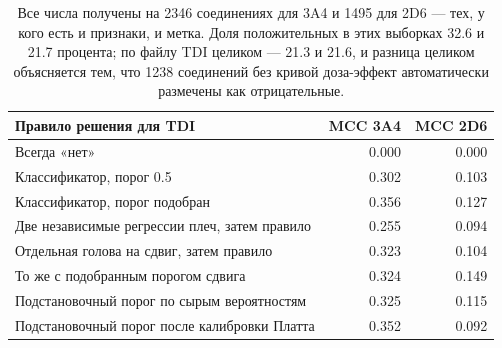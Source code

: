 \begin{table}[htbp]\centering\small
\begin{tabularx}{0.82\textwidth}{@{}Xrr@{}}
\toprule
Правило решения для TDI & MCC 3A4 & MCC 2D6 \\
\midrule
Всегда «нет» & 0.000 & 0.000 \\
Классификатор, порог 0.5 & 0.302 & 0.103 \\
Классификатор, порог подобран & 0.356 & 0.127 \\
Две независимые регрессии плеч, затем правило & 0.255 & 0.094 \\
Отдельная голова на сдвиг, затем правило & 0.323 & 0.104 \\
То же с подобранным порогом сдвига & 0.324 & 0.149 \\
\addlinespace[2pt]
Подстановочный порог по сырым вероятностям & 0.325 & 0.115 \\
Подстановочный порог после калибровки Платта & 0.352 & 0.092 \\
\bottomrule
\end{tabularx}
\caption{Все числа получены на 2346 соединениях для 3A4 и 1495 для 2D6 --- тех, у кого есть и признаки,
и метка. Доля положительных в этих выборках 32.6 и 21.7 процента; по файлу TDI целиком --- 21.3 и 21.6,
и разница целиком объясняется тем, что 1238 соединений без кривой доза-эффект автоматически размечены
как отрицательные.}
\end{table}
